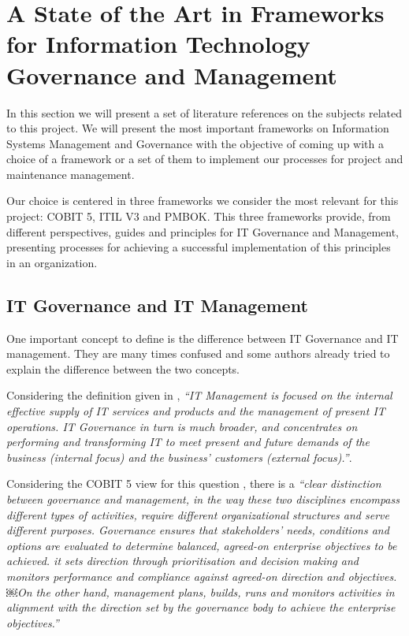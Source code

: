 
% 
% 


\section{A State of the Art in Frameworks for Information Technology Governance and Management}

In this section we will present a set of literature references on the subjects related to this project. We will present the most important frameworks on Information Systems Management and Governance with the objective of coming up with a choice of a framework or a set of them to implement our processes for project and maintenance management.\par
Our choice is centered in three frameworks we consider the most relevant for this project: COBIT 5, ITIL V3 and PMBOK. This three frameworks provide, from different perspectives, guides and principles for IT Governance and Management, presenting processes for achieving a successful implementation of this principles in an organization.

\subsection{IT Governance and IT Management}

One important concept to define is the difference between IT Governance and IT management. They are many times confused and some authors already tried to explain the difference between the two concepts.\par
Considering the definition given in \cite{ITGovAndMech}, \textit{``IT Management is focused on the internal effective supply of IT services and products and the management of present IT operations. IT Governance in turn is much broader, and concentrates on performing and transforming IT to meet present and future demands of the business (internal focus) and the business' customers (external focus).''}.\par
 Considering the COBIT 5 view for this question \cite{2012cobit}, there is a \textit{``clear distinction between governance and management, in the way these two disciplines encompass different types of activities, require different organizational structures and serve different purposes. Governance ensures that stakeholders' needs, conditions and options are evaluated to determine balanced, agreed-on enterprise objectives to be achieved. it sets direction through prioritisation and decision making and monitors performance and compliance against agreed-on direction and objectives.￼On the other hand, management plans, builds, runs and monitors activities in alignment with the direction set by the governance body to achieve the enterprise objectives.''}\par


